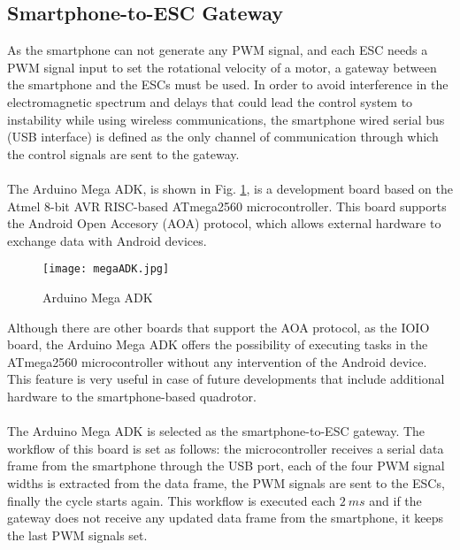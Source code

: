 \subsection{Smartphone-to-ESC Gateway}
As the smartphone can not generate any PWM signal, and each ESC needs a PWM signal input to set the rotational velocity of a motor, a gateway between the smartphone and the ESCs must be used. In order to avoid interference in the electromagnetic spectrum and delays that could lead the control system to instability while using wireless communications, the smartphone wired serial bus (USB interface) is defined as the only channel of communication through which the control signals are sent to the gateway.
\\\\
The Arduino Mega ADK, is shown in Fig. \ref{fig:megaadk}, is a development board based on the Atmel 8-bit AVR RISC-based ATmega2560 microcontroller.  This board supports the Android Open Accesory (AOA) protocol, which allows external hardware to exchange data with Android devices.
\begin{figure}[H]
\begin{center}
\texttt{[image: megaADK.jpg]}    
\caption[Arduino Mega ADK]{Arduino Mega ADK\protect\footnotemark} 
\label{fig:megaadk}
\end{center}
 \end{figure}
\vspace{-0.5cm}
Although there are other boards that support the AOA protocol, as the IOIO board, the Arduino Mega ADK offers the possibility of executing tasks in the ATmega2560 microcontroller without any intervention of the Android device. This feature is very useful in case of future developments that include additional hardware to the smartphone-based quadrotor.
\\\\
The Arduino Mega ADK is selected as the smartphone-to-ESC gateway. The workflow of this board is set as follows: the microcontroller receives a serial data frame from the smartphone through the USB port, each of the four PWM signal widths is extracted from the data frame, the PWM signals are sent to the ESCs, finally the cycle starts again. This workflow is executed each $2\ ms$ and if the gateway does not receive any updated data frame from the smartphone, it keeps the last PWM signals set.


